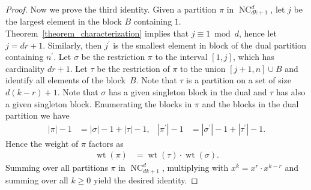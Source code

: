 \documentclass[10pt,a4paper]{amsart}
\DeclareMathOperator{\NC}{NC}
\DeclareMathOperator{\wt}{wt}
\begin{document}
\begin{proof}
Now we prove the third identity.
Given a partition $\pi$ in $\NC^{d}_{dk+1}$,
let $j$ be the largest element in the block $B$ containing $1$.
Theorem~\ref{theorem_characterization} implies
that $j \equiv 1 \bmod d$, hence let $j = dr+1$.
Similarly, then $j^{\prime}$ is the smallest element in
block of the dual partition containing $n^{\prime}$.
Let $\sigma$ be the restriction $\pi$ to the interval $[1,j]$,
which has cardinality $dr+1$.
Let $\tau$ be the restriction of $\pi$ to the union $[j+1,n] \cup B$
and identify all elements of the block~$B$.
Note that $\tau$ is a partition on a set of size $d(k-r) + 1$.
Note that $\sigma$ has a given singleton block in the dual
and $\tau$ has also a given singleton block.
Enumerating the blocks in $\pi$ and the blocks in the dual partition
we have
\begin{align*}
|\pi| -1 & = |\sigma| -1 + |\tau| - 1 , &
|\pi^{\prime}| -1 & = |\sigma^{\prime}| -1 + |\tau^{\prime}| - 1 .
\end{align*}
Hence the weight of $\pi$ factors as
\begin{align*}
\wt(\pi) 
& =
\wt(\tau) \cdot \wt(\sigma) .
\end{align*}
Summing over all partitions $\pi$ in $\NC^{d}_{dk+1}$, multiplying with
$x^{k} = x^{r} \cdot x^{k-r}$ and summing over all
$k \geq 0$ yield the desired identity.
\end{proof}
\end{document}
